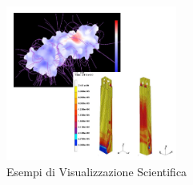 \begin{figure}[H]
    \centering
    \includegraphics[width=0.5\textwidth]{images/ScientImage.png} %
    \caption{Esempi di Visualizzazione Scientifica}
    \label{fig:immagine}
\end{figure}

